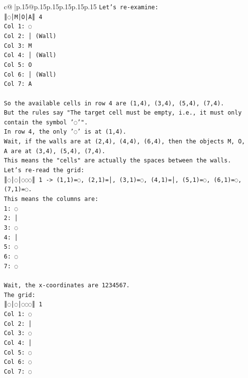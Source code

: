 \documentclass{article}
\begin{document}
{\begin{supertabular}{c@{$\;$}|p{.15\linewidth}@{}p{.15\linewidth}p{.15\linewidth}p{.15\linewidth}p{.15\linewidth}p{.15\linewidth}}
{{{\texttt{Let's re{-}examine:} \\
\texttt{║◌│M│O│A║ 4} \\
\texttt{Col 1: ◌} \\
\texttt{Col 2: │ (Wall)} \\
\texttt{Col 3: M} \\
\texttt{Col 4: │ (Wall)} \\
\texttt{Col 5: O} \\
\texttt{Col 6: │ (Wall)} \\
\texttt{Col 7: A} \\
\\ 
\texttt{So the available cells in row 4 are (1,4), (3,4), (5,4), (7,4).} \\
\texttt{But the rules say "The target cell must be empty, i.e., it must only contain the symbol '◌'".} \\
\texttt{In row 4, the only '◌' is at (1,4).} \\
\texttt{Wait, if the walls are at (2,4), (4,4), (6,4), then the objects M, O, A are at (3,4), (5,4), (7,4).} \\
\texttt{This means the "cells" are actually the spaces between the walls.} \\
\texttt{Let's re{-}read the grid:} \\
\texttt{║◌│◌│◌◌◌║ 1 {-}> (1,1)=◌, (2,1)=│, (3,1)=◌, (4,1)=│, (5,1)=◌, (6,1)=◌, (7,1)=◌.} \\
\texttt{This means the columns are:} \\
\texttt{1: ◌} \\
\texttt{2: │} \\
\texttt{3: ◌} \\
\texttt{4: │} \\
\texttt{5: ◌} \\
\texttt{6: ◌} \\
\texttt{7: ◌} \\
\\ 
\texttt{Wait, the x{-}coordinates are 1234567.} \\
\texttt{The grid:} \\
\texttt{║◌│◌│◌◌◌║ 1} \\
\texttt{Col 1: ◌} \\
\texttt{Col 2: │} \\
\texttt{Col 3: ◌} \\
\texttt{Col 4: │} \\
\texttt{Col 5: ◌} \\
\texttt{Col 6: ◌} \\
\texttt{Col 7: ◌} \\
}}}
\end{supertabular}}
\end{document}
